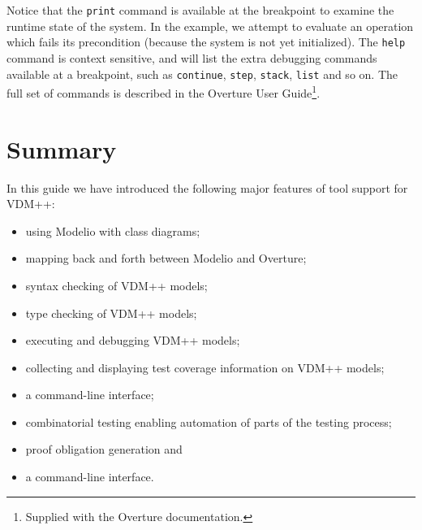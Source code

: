 \noindent Notice that the \verb|print| command is available at the breakpoint
to examine the runtime state of the system. In the example, we attempt to evaluate an
operation which fails its precondition (because the system is not yet
initialized). The \verb|help| command is context sensitive, and will list the
extra debugging commands available at a breakpoint, such as \verb|continue|,
\verb|step|, \verb|stack|, \verb|list| and so on. The full set of commands is
described in the Overture User Guide\footnote{Supplied with the Overture
documentation.}.

\lstset{style=mystyle,language=VDM++}

\section{Summary}\label{sec:toolintrosummary}

In this guide we have introduced the following major features of tool
support for VDM++:
\begin{itemize}
\item using Modelio with class diagrams;
\item mapping back and forth between Modelio and Overture;
\item syntax checking of VDM++ models;
\item type checking of VDM++ models;
\item executing and debugging VDM++ models;
\item collecting and displaying test coverage information on VDM++
  models;
\item a command-line interface;
\item combinatorial testing enabling automation of parts of the
  testing process;
\item proof obligation generation and
\item a command-line interface.
\end{itemize}
